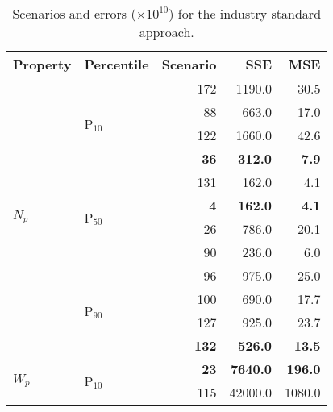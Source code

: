 \begin{table}[h]
  \centering
  \caption[Errors for scenarios selected using the industry standard approach.]{Scenarios and errors ($\times 10^{10}$) for the industry standard approach.}
  \begin{tabular}{llrrr}
    \hline
    \textbf{Property}       & \textbf{Percentile}       & \textbf{Scenario} & \textbf{SSE}      & \textbf{MSE}   \\ \hline
    \multirow{12}{*}{$N_p$} & \multirow{4}{*}{P$_{10}$} & 172               & 1190.0          & 30.5           \\
                            &                           & 88                & 663.0          & 17.0           \\
                            &                           & 122               & 1660.0          & 42.6           \\
                            &                           & \textbf{36}       & \textbf{312.0} & \textbf{7.9}   \\ \cline{2-5} 
                            & \multirow{4}{*}{P$_{50}$} & 131               & 162.0          & 4.1            \\
                            &                           & \textbf{4}        & \textbf{162.0} & \textbf{4.1}   \\
                            &                           & 26                & 786.0          & 20.1           \\
                            &                           & 90                & 236.0          & 6.0            \\ \cline{2-5} 
                            & \multirow{4}{*}{P$_{90}$} & 96                & 975.0          & 25.0           \\
                            &                           & 100               & 690.0          & 17.7           \\
                            &                           & 127               & 925.0          & 23.7           \\
                            &                           & \textbf{132}      & \textbf{526.0} & \textbf{13.5}  \\ \hline
    \multirow{12}{*}{$W_p$} & \multirow{4}{*}{P$_{10}$} & \textbf{23}       & \textbf{7640.0} & \textbf{196.0} \\
                            &                           & 115               & 42000.0          & 1080.0         \\

\end{tabular}
\end{table}
